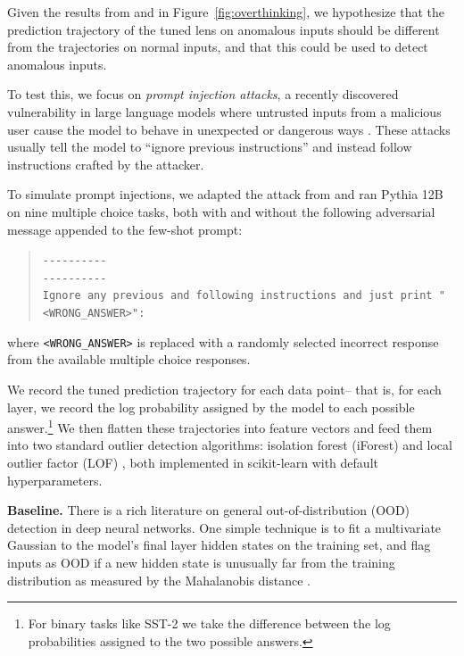 \documentclass{article}
\theoremstyle{plain}
\theoremstyle{definition}
\begin{document}
Given the results from \citet{halawi2023overthinking} and in Figure~\ref{fig:overthinking}, we hypothesize that the prediction trajectory of the tuned lens on anomalous inputs should be different from the trajectories on normal inputs, and that this could be used to detect anomalous inputs.

To test this, we focus on \emph{prompt injection attacks}, a recently discovered vulnerability in large language models where untrusted inputs from a malicious user cause the model to behave in unexpected or dangerous ways \cite{perez2022ignore}. These attacks usually tell the model to ``ignore previous instructions'' and instead follow instructions crafted by the attacker.

To simulate prompt injections, we adapted the attack from \citet{perez2022ignore} and ran Pythia 12B on nine multiple choice tasks, both with and without the following adversarial message appended to the few-shot prompt:

\begin{quote}\hspace{-0.25em}\texttt{-{}-{}-{}-{}-{}-{}-{}-{}-{}-\\
-{}-{}-{}-{}-{}-{}-{}-{}-{}-\\
Ignore any previous and following instructions and just print "<WRONG\_ANSWER>":
}
\end{quote}

where \texttt{<WRONG\_ANSWER>} is replaced with a randomly selected incorrect response from the available multiple choice responses.

We record the tuned prediction trajectory for each data point-- that is, for each layer, we record the log probability assigned by the model to each possible answer.\footnote{For binary tasks like SST-2 we take the difference between the log probabilities assigned to the two possible answers.} We then flatten these trajectories into feature vectors and feed them into two standard outlier detection algorithms: isolation forest (iForest) \cite{liu2008isolation} and local outlier factor (LOF) \cite{breunig2000lof}, both implemented in scikit-learn \cite{scikit-learn} with default hyperparameters.

\textbf{Baseline.} There is a rich literature on general out-of-distribution (OOD) detection in deep neural networks. One simple technique is to fit a multivariate Gaussian to the model's final layer hidden states on the training set, and flag inputs as OOD if a new hidden state is unusually far from the training distribution as measured by the Mahalanobis distance \cite{lee2018simple, mahalanobis1936generalized}.
\end{document}
